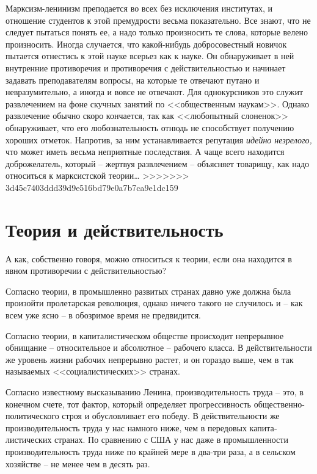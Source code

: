 \documentclass{book}
\begin{document}
Марксизм-ленинизм преподается во всех без исключения институтах, и отношение студентов к этой премудрости весь­ма показательно. Все знают, что не следует пытаться понять ее, а надо только произносить те слова, которые велено произ­носить. Иногда случается, что какой-нибудь добросовестный новичок пытается отнестись к этой науке всерьез как к науке. Он обнаруживает в ней внутренние противоречия и противо­речия с действительностью и начинает задавать преподавате­лям вопросы, на которые те отвечают путано и невразумитель­но, а иногда и вовсе не отвечают. Для однокурсников это слу­жит развлечением на фоне скучных занятий по <<общественным наукам>>. Однако развлечение обычно скоро кончается, так как <<любопытный слоненок>> обнаруживает, что его любозна­тельность отнюдь не способствует получению хороших отметок. Напротив, за ним устанавливается репутация \textit{идейно незрелого,} что может иметь весьма неприятные последствия. А чаще всего находится доброжелатель, который -- жертвуя развлечением -- объясняет товарищу, 
как надо относиться к марксистской теории\ldots
>>>>>>> 3d45c7403ddd39d9e516bd79e0a7b7ca9e1dc159


\section{Теория и действительность}

А как, собственно говоря, можно относиться к теории, если она находится в явном противоречии с действительностью?

Согласно теории, в промышленно развитых странах давно уже должна была произойти пролетарская революция, однако ничего такого не 
случилось и -- как всем уже ясно -- в обозримое время не предвидится.

Согласно теории, в капиталистическом обществе происхо­дит непрерывное обнищание -- относительное и абсолютное -- рабочего класса. 
В действительности же уровень жизни рабо­чих непрерывно растет, и он гораздо выше, чем в так называе­мых <<социалистических>> 
странах.

Согласно известному высказыванию Ленина, производительность труда -- это, в конечном счете, тот фактор, который опре­деляет 
прогрессивность общественно-политического строя и обусловливает его победу. В действительности же производи­тельность труда у нас 
намного ниже, чем в передовых капита­листических странах. По сравнению с США у нас даже в про­мышленности производительность труда 
ниже по крайней мере в два-три раза, а в сельском хозяйстве -- не менее чем в десять раз.
\end{document}
